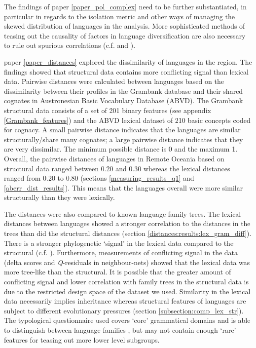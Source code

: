 \documentclass[a4paper,10pt]{article} %
\begin{document}

The findings of paper \ref{paper_pol_complex} need to be further substantiated, in particular in regards to the isolation metric and other ways of managing the skewed distribution of languages in the analysis. More sophisticated methods of teasing out the causality of factors in language diversification are also necessary to rule out spurious correlations (c.f. \cite{Sean_2018} and \cite{Pacheco_Coelho_2019}). 

paper \ref{paper_distances} explored the dissimilarity of languages in the region. The findings showed that structural data contains more conflicting signal than lexical data. Pairwise distances were calculated between languages based on the dissimilarity between their profiles in the Grambank database and their shared cognates in Austronesian Basic Vocabulary Database (ABVD). The Grambank structural data consists of a set of 201 binary features (see appendix \ref{Grambank_features}) and the ABVD lexical dataset of 210 basic concepts coded for cognacy. A small pairwise distance indicates that the languages are similar structurally/share many cognates; a large pairwise distance indicates that they are very dissimilar. The minimum possible distance is 0 and the maximum 1. Overall, the pairwise distances of languages in Remote Oceania based on structural data ranged between 0.20 and 0.30 whereas the lexical distances ranged from 0.20 to 0.80 (sections \ref{measuring_results_q1} and \ref{aberr_dist_results}). This means that the languages overall were more similar structurally than they were lexically.

The distances were also compared to known language family trees. The lexical distances between languages showed a stronger correlation to the distances in the trees than did the structural distances (section \ref{distances:results:lex_gram_diff}). There is a stronger phylogenetic `signal' in the lexical data compared to the structural (c.f. \cite{greenhilletal_2017}). Furthermore, measurements of conflicting signal in the data (delta scores and \emph{Q}-residuals in neighbour-nets) showed that the lexical data was more tree-like than the structural. It is possible that the greater amount of conflicting signal and lower correlation with family trees in the structural data is due to the restricted design space of the dataset we used. Similarity in the lexical data necessarily implies inheritance whereas structural features of languages are subject to different evolutionary pressures (section \ref{subsection:comp_lex_str}). The typological questionnaire used covers `core' grammatical domains and is able to distinguish between language families \citep{grambank_release}, but may not contain enough `rare' features for teasing out more lower level subgroups.
\end{document}
